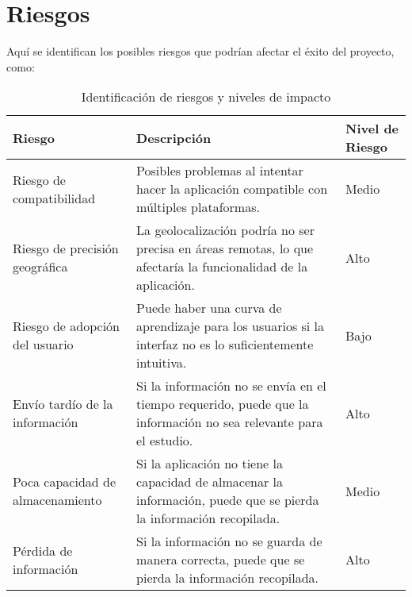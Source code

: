 \documentclass[a4paper,12pt]{article}
\begin{document}
\section{Riesgos}
Aquí se identifican los posibles riesgos que podrían afectar el éxito del proyecto, como:

\begin{table}[h!]
    \centering
    \begin{tabular}{|p{4cm}|p{8cm}|p{2cm}|}
    \hline
    \textbf{Riesgo} & \textbf{Descripción} & \textbf{Nivel de Riesgo} \\ \hline
    Riesgo de compatibilidad & Posibles problemas al intentar hacer la aplicación compatible con múltiples plataformas. & Medio \\ \hline
    Riesgo de precisión geográfica & La geolocalización podría no ser precisa en áreas remotas, lo que afectaría la funcionalidad de la aplicación. & Alto \\ \hline
    Riesgo de adopción del usuario & Puede haber una curva de aprendizaje para los usuarios si la interfaz no es lo suficientemente intuitiva. & Bajo \\ \hline
    Envío tardío de la información & Si la información no se envía en el tiempo requerido, puede que la información no sea relevante para el estudio. & Alto \\ \hline
    Poca capacidad de almacenamiento & Si la aplicación no tiene la capacidad de almacenar la información, puede que se pierda la información recopilada. & Medio \\ \hline
    Pérdida de información & Si la información no se guarda de manera correcta, puede que se pierda la información recopilada. & Alto \\ \hline
    \end{tabular}
    \caption{Identificación de riesgos y niveles de impacto}
    \label{tab:riesgos}
    \end{table}
    
\end{document}
